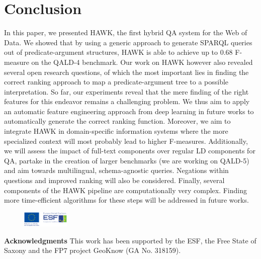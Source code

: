 \documentclass{llncs}
\begin{document}
\section{Conclusion}
\label{sec:conclusion}
In this paper, we presented HAWK, the first hybrid QA system for the Web of Data. We showed that by using a generic approach to generate SPARQL queries out of predicate-argument structures, HAWK is able to achieve up to 0.68 F-measure on the QALD-4 benchmark. Our work on HAWK however also revealed several open research questions, of which the most important lies in finding the correct ranking approach to map a predicate-argument tree to a possible interpretation. So far, our experiments reveal that the mere finding of the right features for this endeavor remains a challenging problem. We thus aim to apply an automatic feature engineering approach from deep learning in future works to automatically generate the correct ranking function. Moreover, we aim to integrate HAWK in domain-specific information systems where the more specialized context will most probably lead to higher F-measures. Additionally, we will assess the impact of full-text components over regular LD components for QA, partake in the creation of larger benchmarks (we are working on QALD-5) and aim towards multilingual, schema-agnostic queries. Negations within questions and improved ranking will also be considered. Finally, several components of the HAWK pipeline are computationally very complex. Finding more time-efficient algorithms for these steps will be addressed in future works.


\begin{figure}
 \vspace{-8mm}
 \includegraphics[width=0.20\textwidth]{esf.pdf}
\end{figure}
\textbf{Acknowledgments}
This work has been supported by the ESF, the Free State of Saxony and the FP7 project GeoKnow (GA No. 318159).



\end{document}
